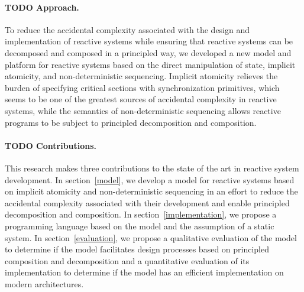\paragraph{TODO Approach.}
To reduce the accidental complexity associated with the design and implementation of reactive systems while ensuring that reactive systems can be decomposed and composed in a principled way, we developed a new model and platform for reactive systems based on the direct manipulation of state, implicit atomicity, and non-deterministic sequencing.
Implicit atomicity relieves the burden of specifying critical sections with synchronization primitives, which seems to be one of the greatest sources of accidental complexity in reactive systems, while the semantics of non-deterministic sequencing allows reactive programs to be subject to principled decomposition and composition.

\paragraph{TODO Contributions.}
This research makes three contributions to the state of the art in reactive system development.
In section~\ref{model}, we develop a model for reactive systems based on implicit atomicity and non-deterministic sequencing in an effort to reduce the accidental complexity associated with their development and enable principled decomposition and composition.
In section~\ref{implementation}, we propose a programming language based on the model and the assumption of a static system.
In section~\ref{evaluation}, we propose a qualitative evaluation of the model to determine if the model facilitates design processes based on principled composition and decomposition and a quantitative evaluation of its implementation to determine if the model has an efficient implementation on modern architectures.
